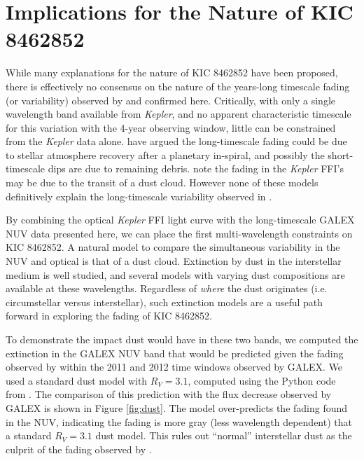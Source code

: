 \documentclass[twocolumn]{aastex6}
\newcommand{\Kepler}{\textsl{Kepler}\xspace}
\begin{document}
\section{Implications for the Nature of KIC 8462852}
\label{sec:dust}

While many explanations for the nature of KIC 8462852 have been proposed, there is effectively no consensus on the nature of the years-long timescale fading (or variability) observed by \citet{montet2016} and confirmed here. Critically, with only a single wavelength band available from \Kepler, and no apparent characteristic timescale for this variation with the 4-year observing window, little can be constrained from the \Kepler data alone. \citet{metzger2017} have argued the long-timescale fading could be due to stellar atmosphere recovery after a planetary in-spiral, and possibly the short-timescale dips are due to remaining debris. \citet{montet2016} note the fading in the \Kepler FFI's may be due to the transit of a dust cloud. However none of these models definitively explain the long-timescale variability observed in \citet{montet2016}.  


By combining the optical \Kepler FFI light curve with the long-timescale GALEX NUV data presented here, we can place the first multi-wavelength constraints on KIC 8462852. A natural model to compare the simultaneous variability in the NUV and optical is that of a dust cloud. Extinction by dust in the interstellar medium is well studied, and several models with varying dust compositions are available at these wavelengths. Regardless of {\it where} the dust originates (i.e. circumstellar versus interstellar), such extinction models are a useful path forward in exploring the fading of KIC 8462852.

To demonstrate the impact dust would have in these two bands, we computed the extinction in the GALEX NUV band that would be predicted given the fading observed by \citet{montet2016} within the 2011 and 2012 time windows observed by GALEX. We used a standard \citet{cardelli1989} dust model with $R_V=3.1$, computed using the Python code from \citet{barbary2016}. The comparison of this prediction with the flux decrease observed by GALEX is shown in Figure \ref{fig:dust}. The \citet{cardelli1989} model over-predicts the fading found in the NUV, indicating the fading is more gray (less wavelength dependent) that a standard $R_V=3.1$ dust model. This rules out ``normal'' interstellar dust as the culprit of the fading observed by \citet{montet2016}.
\end{document}

